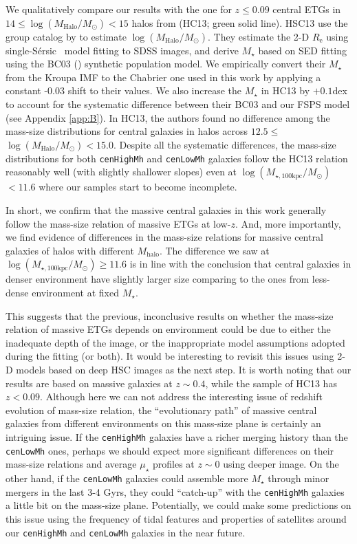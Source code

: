 \documentclass{emulateapj}
\def\ser{{S\'{e}rsic\ }}
\def\rbcg{\texttt{cenHighMh}}
\def\nbcg{\texttt{cenLowMh}}
\def\mstar{{$M_{\star}$}}
\def\mhalo{{$M_{\mathrm{halo}}$}}
\def\logmh{{$\log (M_{\mathrm{Halo}}/M_{\odot})$}}
\def\logmtot{{$\log (M_{\star,100\mathrm{kpc}}/M_{\odot})$}}
\def\mden{{$\mu_{\star}$}}
\begin{document}
\begin{CJK*}{UTF8}{gbsn}
    We qualitatively compare our results with the one for $z\leq 0.09$ central ETGs in  
    $14\le$\logmh{}$<15$ halos from \citealt{HCompany13} (HC13; green solid line).
    HSC13 use the group catalog by \citet{Yang2007} to estimate \logmh{}. 
    They estimate the 2-D $R_{\mathrm{e}}$ using single-\ser{} model fitting to SDSS images,
    and derive \mstar{} based on SED fitting using the BC03 (\citealt{BC03}) synthetic 
    population model.
    We empirically convert their \mstar{} from the Kroupa IMF to the Chabrier one 
    used in this work by applying a constant -0.03 shift to their values. 
    We also increase the \mstar{} in HC13 by $+0.1$dex to account for the systematic 
    difference between their BC03 and our FSPS model (see Appendix \ref{app:B}). 
    In HC13, the authors found no difference among the mass-size distributions for 
    central galaxies in halos across $12.5\le$\logmh{}$<15.0$. 
    Despite all the systematic differences, the mass-size distributions for both \rbcg{} 
    and \nbcg{} galaxies follow the HC13 relation reasonably well (with slightly
    shallower slopes) even at \logmtot{}$< 11.6$ where our samples start to become 
    incomplete. 
    
    In short, we confirm that the massive central galaxies in this work generally 
    follow the mass-size relation of massive ETGs at low-$z$.
    And, more importantly, we find evidence of differences in the mass-size relations for 
    massive central galaxies of halos with different \mhalo{}. 
    The difference we saw at \logmtot{}$\geq 11.6$ is in line with the conclusion that
    central galaxies in denser environment have slightly larger size comparing to the 
    ones from less-dense environment at fixed \mstar{}. 
    
    This suggests that the previous, inconclusive results on whether the 
    mass-size relation of massive ETGs depends on environment could be due to 
    either the inadequate depth of the image, or the inappropriate model assumptions 
    adopted during the fitting (or both).  
    It would be interesting to revisit this issues using 2-D models based on deep HSC 
    images as the next step.
    It is worth noting that our results are based on massive galaxies at $z\sim 0.4$, 
    while the sample of HC13 has $z<0.09$.
    Although here we can not address the interesting issue of redshift evolution of 
    mass-size relation, the ``evolutionary path'' of massive central galaxies from 
    different environments on this mass-size plane is certainly an intriguing issue. 
    If the \rbcg{} galaxies have a richer merging history than the \nbcg{} ones, 
    perhaps we should expect more significant differences on their mass-size 
    relations and average \mden{} profiles at $z\sim 0$ using deeper image. 
    On the other hand, if the \nbcg{} galaxies could assemble more \mstar{} through minor 
    mergers in the last 3-4 Gyrs, they could ``catch-up'' with the \rbcg{} galaxies 
    a little bit on the mass-size plane. 
    Potentially, we could make some predictions on this issue using the frequency of 
    tidal features and properties of satellites around our \rbcg{} and \nbcg{} 
    galaxies in the near future.
    

\end{CJK*}
\end{document}
